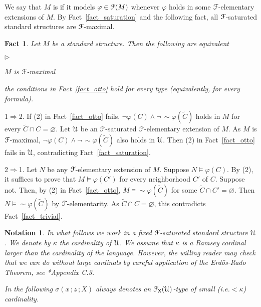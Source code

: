 \documentclass{amsproc}
\makeatletter
\newcommand{\mylabel}[1]{{#1}\hfill}
\renewenvironment{itemize}
  {\begin{list}{$\triangleright$}{%
  \setlength{\parskip}{0mm}
  \setlength{\topsep}{.1\baselineskip}
  \setlength{\rightmargin}{0mm}
  \setlength{\listparindent}{0mm}
  \setlength{\itemindent}{0mm}
  \setlength{\labelwidth}{3ex}
  \setlength{\itemsep}{.1\baselineskip}
  \setlength{\parsep}{.1\baselineskip}
  \setlength{\partopsep}{0mm}
  \setlength{\labelsep}{1ex}
  \setlength{\leftmargin}{\labelwidth+\labelsep}
  \let\makelabel\mylabel}}{%
\end{list}}
\newcounter{thm}
\theoremstyle{mio}
\newtheorem{fact}[thm]{Fact}\tcolorboxenvironment{fact}{mythm}
\newtheorem{notation}[thm]{Notation}\tcolorboxenvironment{notation}{mythm}
\providecommand{\proofNameStyle}{\bfseries}
\renewenvironment{proof}[1][\proofname]{\par
  \pushQED{\qed}%
  \normalfont%
  \trivlist
  \item[\hskip\labelsep
        \proofNameStyle
    #1\@addpunct{.}]\ignorespaces
}{%
  \popQED\endtrivlist\@endpefalse
}
\renewcommand*{\emph}[1]{%
   \smash{\tikz[baseline]\node[rectangle, fill=teal!25, rounded corners, inner xsep=0.5ex, inner ysep=0.2ex, anchor=base, minimum height = 2.7ex]{\strut #1};}}
\makeatother
\begin{document}
We say that $M$ is \emph{${\EuScript F}$-maximal\/} if it models $\varphi\in{\EuScript F}(M)$ whenever $\varphi$ holds in some ${\EuScript F}$-elemen\-tary extensions of $M$.
By Fact~\ref{fact_saturation} and the following fact, all ${\EuScript F}$-saturated standard structures are ${\EuScript F}$-maximal.

\begin{fact}\label{fact_maximal}
  Let $M$ be a standard structure.
  Then the following are equivalent
  \begin{itemize}
    \item [1.] $M$ is ${\EuScript F}$-maximal
    \item [2.] the conditions in Fact~\ref{fact_otto} hold for every type (equivalently, for every formula). 
  \end{itemize}
\end{fact}

\begin{proof}
  1$\Rightarrow$2.
  If (2) in Fact~\ref{fact_otto} fails, $\neg\varphi(C)\wedge\neg\,{\sim}\varphi(\tilde C)$ holds in $M$ for every $\tilde C\cap C=\varnothing$.
  Let ${\EuScript U}$ be an ${\EuScript F}$-saturated ${\EuScript F}$-elementary extension of $M$.
  As $M$ is ${\EuScript F}$-maximal, $\neg\varphi(C)\wedge\neg\,{\sim}\varphi(\tilde C)$ also holds in ${\EuScript U}$.
  Then (2) in Fact~\ref{fact_otto} fails in ${\EuScript U}$, contradicting Fact~\ref{fact_saturation}.

  2$\Rightarrow$1. 
  Let $N$ be any ${\EuScript F}$-elementary extension of $M$.
  Suppose $N\models\varphi(C)$.
  By (2), it suffices to prove that $M\models\varphi(C')$ for every neighborhood $C'$ of $C$.
  Suppose not.
  Then, by (2) in Fact~\ref{fact_otto}, $M\models{\sim}\varphi(\tilde C)$ for some $\tilde C\cap C'=\varnothing$.
  Then $N\models{\sim}\varphi(\tilde C)$ by ${\EuScript F}$-elementarity.
  As $\tilde C\cap C=\varnothing$, this contradicts Fact~\ref{fact_trivial}.
\end{proof}

\begin{notation}
  In what follows we work in a fixed ${\EuScript F}$-saturated standard structure ${\EuScript U}$.
  We denote by $\kappa$ the cardinality of ${\EuScript U}$.
  We assume that $\kappa$ is a Ramsey cardinal larger than the cardinality of the language.
  However, the willing reader may check that we can do without large cardinals by careful application of the Erd\H{o}s-Rado Theorem, see \cite{TZ}*{Appendix C.3}.\smallskip

  In the following $\sigma(x\,;z\,;X)$ always denotes an ${\EuScript F}_{\sf X}({\EuScript U})$-type of small (i.e.\@ $<\kappa$) cardinality.
\end{notation}
\end{document}

